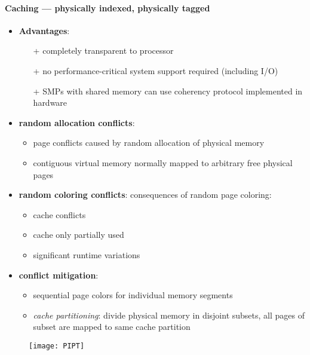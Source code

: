\paragraph{Caching --- physically indexed, physically tagged}
\begin{itemize}
  \item \textbf{Advantages}:
  \begin{itemize}
    \item[+] completely transparent to processor
    \item[+] no performance-critical system support required (including I/O)
    \item[+] SMPs with shared memory can use coherency protocol implemented in hardware
  \end{itemize}
  \item \textbf{random allocation conflicts}:
  \begin{itemize}
    \item page conflicts caused by random allocation of physical memory
    \item contiguous virtual memory normally mapped to arbitrary free physical pages
  \end{itemize}
  \item \textbf{random coloring conflicts}: consequences of random page coloring:
  \begin{itemize}
    \item cache conflicts
    \item cache only partially used
    \item significant runtime variations
  \end{itemize}
  \item \textbf{conflict mitigation}:
  \begin{itemize}
    \item sequential page colors for individual memory segments
    \item \emph{cache partitioning}: divide physical memory in disjoint subsets, all pages of subset are mapped to same cache partition
  \end{itemize}
\end{itemize}
\begin{figure}[h]\centering\label{PIPT}\texttt{[image: PIPT]}\end{figure}
